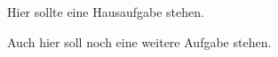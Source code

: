 \documentclass[a4paper, 11pt, ngerman]{scrartcl}
\begin{document}

\begin{hausaufgabe}
	Hier sollte eine Hausaufgabe stehen.
\end{hausaufgabe}

\begin{hausaufgabe}
	Auch hier soll noch eine weitere Aufgabe stehen.
\end{hausaufgabe}
\end{document}
